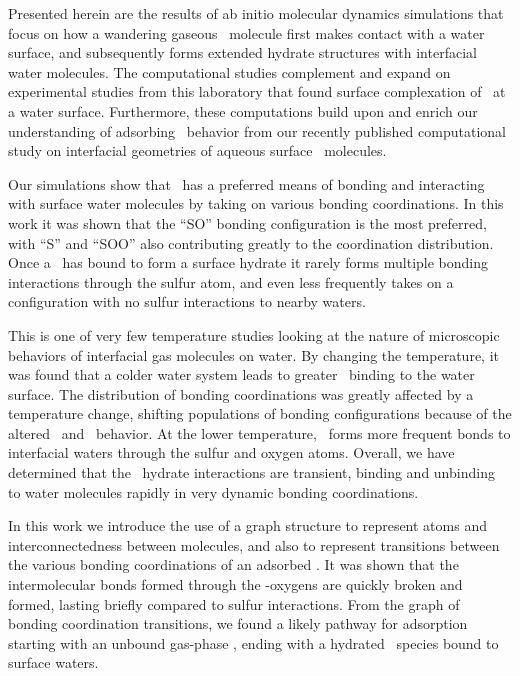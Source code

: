 \documentclass{article}
\begin{document}
Presented herein are the results of ab initio molecular dynamics simulations that focus on how a wandering gaseous \suldiox~molecule first makes contact with a water surface, and subsequently forms extended hydrate structures with interfacial water molecules. The computational studies complement and expand on experimental studies from this laboratory that found surface complexation of \suldiox~at a water surface.\cite{Tarbuck2005,Tarbuck2006,Ota2011} Furthermore, these computations build upon and enrich our understanding of adsorbing \suldiox~behavior from our recently published computational study on interfacial geometries of aqueous surface \suldiox~molecules.\cite{Shamay2011}

Our simulations show that \suldiox~has a preferred means of bonding and interacting with surface water molecules by taking on various bonding coordinations. In this work it was shown that the ``SO'' bonding configuration is the most preferred, with ``S'' and ``SOO'' also contributing greatly to the coordination distribution. Once a \suldiox~has bound to form a surface hydrate it rarely forms multiple bonding interactions through the sulfur atom, and even less frequently takes on a configuration with no sulfur interactions to nearby waters.

This is one of very few temperature studies looking at the nature of microscopic behaviors of interfacial gas molecules on water. By changing the temperature, it was found that a colder water system leads to greater \suldiox~binding to the water surface. The distribution of bonding coordinations was greatly affected by a temperature change, shifting populations of bonding configurations because of the altered \suldiox~and \wat~behavior. At the lower temperature, \suldiox~forms more frequent bonds to interfacial waters through the sulfur and oxygen atoms. Overall, we have determined that the \suldiox~hydrate interactions are transient, binding and unbinding to water molecules rapidly in very dynamic bonding coordinations.

In this work we introduce the use of a graph structure to represent atoms and interconnectedness between molecules, and also to represent transitions between the various bonding coordinations of an adsorbed \suldiox. It was shown that the intermolecular bonds formed through the \suldiox-oxygens are quickly broken and formed, lasting briefly compared to sulfur interactions. From the graph of bonding coordination transitions, we found a likely pathway for \suldiox adsorption starting with an unbound gas-phase \suldiox, ending with a hydrated \suldiox~species bound to surface waters.
\end{document}
